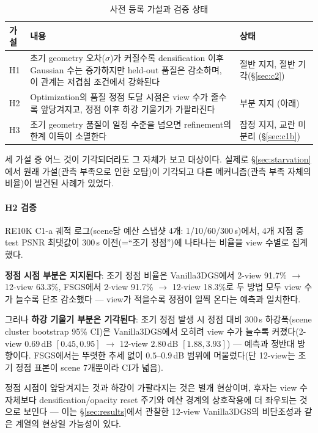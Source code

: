 \begin{table}[t]
\centering
\caption{사전 등록 가설과 검증 상태}
\label{tab:hypotheses}
\small
\begin{tabular}{@{}l L{12cm} L{2.6cm}@{}}
\toprule
가설 & 내용 & 상태 \\
\midrule
H1 & 초기 geometry 오차($\sigma$)가 커질수록 densification 이후 Gaussian 수는 증가하지만 held-out 품질은 감소하며, 이 관계는 저겹침 조건에서 강화된다 & 절반 지지, 절반 기각(\S\ref{sec:c2}) \\
H2 & Optimization의 품질 정점 도달 시점은 view 수가 줄수록 앞당겨지고, 정점 이후 하강 기울기가 가팔라진다 & 부분 지지 (아래) \\
H3 & 초기 geometry 품질이 일정 수준을 넘으면 refinement의 한계 이득이 소멸한다 & 잠정 지지, 교란 미분리 (\S\ref{sec:c1b}) \\
\bottomrule
\end{tabular}
\end{table}

세 가설 중 어느 것이 기각되더라도 그 자체가 보고 대상이다. 실제로 \S\ref{sec:starvation}에서 원래 가설(관측 부족으로 인한 오탐)이 기각되고 다른 메커니즘(관측 부족 자체의 비율)이 발견된 사례가 있었다.

\paragraph{H2 검증} RE10K C1-a 궤적 로그(scene당 예산 스냅샷 4개: 1/10/60/300\,s)에서, 4개 지점 중 test PSNR 최댓값이 300\,s 이전(=``조기 정점'')에 나타나는 비율을 view 수별로 집계했다.

\textbf{정점 시점 부분은 지지된다}: 조기 정점 비율은 Vanilla3DGS에서 2-view 91.7\% $\to$ 12-view 63.3\%, FSGS에서 2-view 91.7\% $\to$ 12-view 18.3\%로 두 방법 모두 view 수가 늘수록 단조 감소했다 — view가 적을수록 정점이 일찍 온다는 예측과 일치한다.

그러나 \textbf{하강 기울기 부분은 기각된다}: 조기 정점 발생 시 정점 대비 300\,s 하강폭(scene cluster bootstrap 95\% CI)은 Vanilla3DGS에서 오히려 view 수가 늘수록 커졌다(2-view $0.69\,$dB $[0.45,0.95]$ $\to$ 12-view $2.80\,$dB $[1.88,3.93]$) — 예측과 정반대 방향이다. FSGS에서는 뚜렷한 추세 없이 $0.5$--$0.9\,$dB 범위에 머물렀다(단 12-view는 조기 정점 표본이 scene 7개뿐이라 CI가 넓음).

정점 시점이 앞당겨지는 것과 하강이 가팔라지는 것은 별개 현상이며, 후자는 view 수 자체보다 densification/opacity reset 주기와 예산 경계의 상호작용에 더 좌우되는 것으로 보인다 — 이는 \S\ref{sec:results}에서 관찰한 12-view Vanilla3DGS의 비단조성과 같은 계열의 현상일 가능성이 있다.

